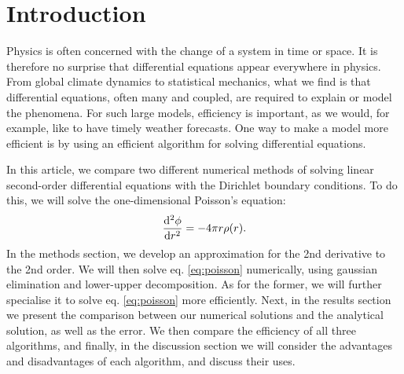 \section{Introduction}
\label{sec:introduction}

Physics is often concerned with the change of a system in time or space.
It is therefore no surprise that differential equations appear
everywhere in physics. From global climate dynamics to statistical mechanics,
what we find is that differential equations, often many and coupled, are
required to explain or model the phenomena. For such large models, efficiency
is important, as we would, for example, like to have timely weather forecasts.
One way to make a model more efficient is by using an efficient algorithm for
solving differential equations.

In this article, we compare two different numerical methods of solving linear
second-order differential equations with the Dirichlet boundary conditions.
To do this, we will solve the one-dimensional Poisson's equation:
  \begin{equation}
  \label{eq:poisson}
    \dv[2]{\phi}{r} = -4\pi r \rho\qty(r).
  \end{equation}
In the methods section, we develop an approximation for the
2nd derivative to the 2nd order. We will then solve eq. \ref{eq:poisson}
numerically, using gaussian elimination and lower-upper decomposition. As for
the former, we will further specialise it to solve eq. \ref{eq:poisson} more
efficiently. Next, in the results section we present the comparison
between our numerical solutions and the analytical solution, as well as the error.
We then compare the efficiency of all three algorithms, and finally, in the
discussion section we will consider the advantages and disadvantages
of each algorithm, and discuss their uses.
